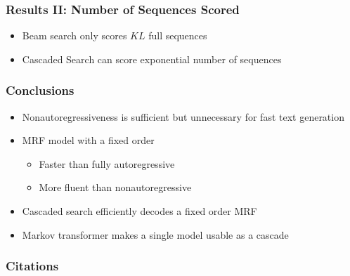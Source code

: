 \documentclass{beamer}
\begin{document}
\begin{frame}
\frametitle{Results II: Number of Sequences Scored}
\begin{itemize}
    \item<1-> Beam search only scores $KL$ full sequences
    \item<2-> Cascaded Search can score exponential number of sequences
\end{itemize}
\begin{overlayarea}{\textwidth}{6cm}
\begin{center}
\end{center}
\end{overlayarea}
\end{frame}

\begin{frame}
\frametitle{Conclusions}
\begin{itemize}
    \item<1-> Nonautoregressiveness is sufficient but unnecessary for fast text generation
    \item<2-> MRF model with a fixed order
    \begin{itemize}
        \item Faster than fully autoregressive
        \item More fluent than nonautoregressive
    \end{itemize}
\item<3-> Cascaded search efficiently decodes a fixed order MRF
\item<4-> Markov transformer makes a single model usable as a cascade
\end{itemize}
\end{frame}




\begin{frame}
\frametitle{Citations}


\end{frame}
\end{document}
